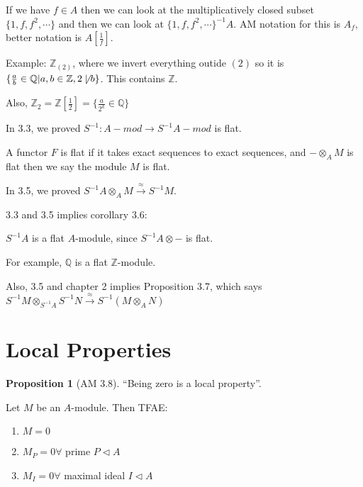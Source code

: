 \documentclass{article}
\theoremstyle{definition}
\newtheorem{proposition}{Proposition}
\begin{document}
If we have \(f\in A\) then we can look at the multiplicatively closed subset \(\{ 1, f, f^2, \cdots \} \) and then we can look at \(\{ 1, f, f^2,\cdots \} ^{-1} A\). AM notation for this is \(A_f\), better notation is \(A[\frac{1}{f}]\).

Example: \(\mathbb{Z}_{(2)}\), where we invert everything outide \((2)\) so it is \(\{ \frac{a}{b}\in\mathbb{Q} | a,b\in\mathbb{Z} ,2 \not\mid b \} \). This contains \(\mathbb{Z}\).

Also, \(\mathbb{Z}_2 = \mathbb{Z}[\frac{1}{2}] = \{ \frac{a}{2^k}\in\mathbb{Q} \} \) 

In 3.3, we proved \(S ^{-1} : A-mod\to S^{-1} A-mod\) is flat.

A functor \(F\) is flat if it takes exact sequences to exact sequences, and \(-\otimes_A M\) is flat then we say the module \(M\) is flat.

In 3.5, we proved \(S ^{-1} A \otimes_A M \overset{\approx}{\to } S ^{-1} M\).

3.3 and 3.5 implies corollary 3.6:

\(S ^{-1} A\) is a flat \(A\)-module, since \(S ^{-1} A \otimes -\) is flat.

For example, \(\mathbb{Q}\) is a flat \(\mathbb{Z}\)-module.

Also, 3.5 and chapter 2 implies Proposition 3.7, which says \(S ^{-1} M \otimes_{S ^{-1} A} S ^{-1} N \overset{\approx }{\to } S ^{-1} (M \otimes _A N)\) 

\section*{Local Properties}

\begin{proposition}
    [AM 3.8]

    ``Being zero is a local property''.

    Let \(M\) be an \(A\)-module. Then TFAE:

    \begin{enumerate}
        \item \(M = 0\) 
        \item \(M_P = 0 \forall\) prime \(P \triangleleft A\) 
        \item \(M_I = 0 \forall \) maximal ideal \(I \triangleleft A\) 
    \end{enumerate}
\end{proposition}
\end{document}
